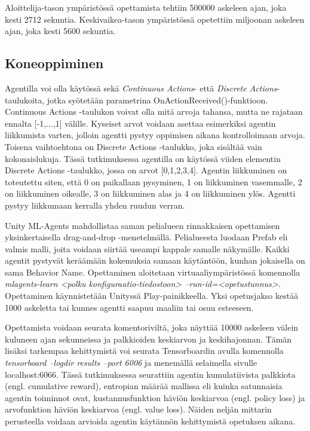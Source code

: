 \documentclass[utf8]{gradu3}
\begin{document}
Aloittelija-tason ympäristössä opettamista tehtiin 500000 askeleen ajan, joka kesti 2712 sekuntia. Keskivaikea-tason ympäristössä opetettiin miljoonan askeleen ajan, joka kesti 5600 sekuntia.

\subsection{Koneoppiminen}

Agentilla voi olla käytössä sekä \textit{Continuous Actions}- että \textit{Discrete Actions}-taulukoita, jotka syötetään parametrina OnActionReceived()-funktioon. Continuous Actions -taulukon voivat olla mitä arvoja tahansa, mutta ne rajataan ennalta [-1,...,1] välille. Kyseiset arvot voidaan asettaa esimerkiksi agentin liikkumista varten, jolloin agentti pystyy oppimisen aikana kontrolloimaan arvoja. Toisena vaihtoehtona on Discrete Actions -taulukko, joka sisältää vain kokonaislukuja. Tässä tutkimuksessa agentilla on käytössä viiden elementin Discrete Actions -taulukko, jossa on arvot [0,1,2,3,4]. Agentin liikkuminen on toteutettu siten, että 0 on paikallaan pysyminen, 1 on liikkuminen vasemmalle, 2 on liikkuminen oikealle, 3 on liikkuminen alas ja 4 on liikkuminen ylös. Agentti pystyy liikkumaan kerralla yhden ruudun verran.

Unity ML-Agents mahdollistaa saman pelialueen rinnakkaisen opettamisen yksinkertaisella drag-and-drop -menetelmällä. Pelialueesta luodaan Prefab eli valmis malli, joita voidaan siirtää useampi kappale samalle näkymälle. Kaikki agentit pystyvät keräämään kokemuksia samaan käytäntöön, kunhan jokaisella on sama Behavior Name. Opettaminen aloitetaan virtuaaliympäristössä komennolla \textit{mlagents-learn <polku konfiguraatio-tiedostoon> --run-id=<opetustunnus>}. Opettaminen käynnistetään Unityssä Play-painikkeella. Yksi opetusjakso kestää 1000 askeletta tai kunnes agentti saapuu maaliin tai osuu esteeseen.

Opettamista voidaan seurata komentoriviltä, joka näyttää 10000 askeleen välein kuluneen ajan sekunneissa ja palkkioiden keskiarvon ja keskihajonnan. Tämän lisäksi tarkempaa kehittymistä voi seurata Tensorboardin avulla komennolla \textit{tensorboard --logdir results --port 6006} ja menemällä selaimella sivulle localhost:6066. Tässä tutkimuksessa seurattiin agentin kumulatiivista palkkiota (engl. cumulative reward), entropian määrää mallissa eli kuinka satunnaisia agentin toiminnot ovat, kustannusfunktion häviön keskiarvoa (engl. policy loss) ja arvofunktion häviön keskiarvoa (engl. value loss). Näiden neljän mittarin perusteella voidaan arvioida agentin käytännön kehittymistä opetuksen aikana.
\end{document}
